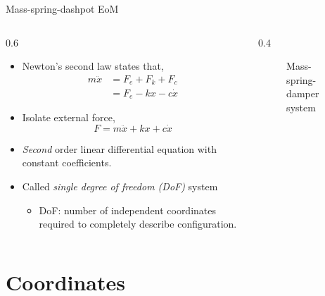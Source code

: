 \documentclass[11pt,aspectratio=169,handout]{beamer}
\begin{document}
\begin{frame}[c]{Mass-spring-dashpot EoM}
	\begin{columns}[T]
		\begin{column}{0.6\textwidth}
			\begin{itemize}
				\item Newton's second law states that,
				\begin{align}\nonumber
					m \ddot{x} &= F_e + F_k + F_c \\
				 &=  F_e -kx -c\dot{x}
				\end{align}
				\item Isolate external force,
				\begin{equation}\label{EoM2}
					F = m\ddot{x} + kx + c\dot{x}
				\end{equation}
			\item  \textit{Second} order linear differential equation with constant coefficients. 
			\item Called \textit{single degree of freedom (DoF)} system
						\begin{itemize}
			\item[-] DoF: number of independent coordinates required to completely describe configuration.
		\end{itemize}
			\end{itemize}
		\end{column}
		\begin{column}{0.4\textwidth}
			\begin{figure}
				\centering
				
				\caption{Mass-spring-damper system}
			\end{figure}

		\end{column}
	\end{columns}
\end{frame}


\section{Coordinates}
\end{document}
